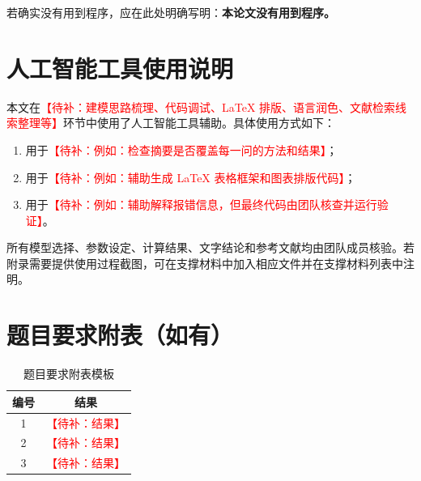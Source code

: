 \documentclass[UTF8,a4paper,zihao=5]{ctexart}
\numberwithin{equation}{section}
\numberwithin{figure}{section}
\numberwithin{table}{section}
\newcommand{\todo}[1]{\textcolor{red}{【待补：#1】}}
\begin{document}
若确实没有用到程序，应在此处明确写明：\textbf{本论文没有用到程序。}

\section{人工智能工具使用说明}
本文在\todo{建模思路梳理、代码调试、LaTeX 排版、语言润色、文献检索线索整理等}环节中使用了人工智能工具辅助。具体使用方式如下：
\begin{enumerate}
  \item 用于\todo{例如：检查摘要是否覆盖每一问的方法和结果}；
  \item 用于\todo{例如：辅助生成 LaTeX 表格框架和图表排版代码}；
  \item 用于\todo{例如：辅助解释报错信息，但最终代码由团队核查并运行验证}。
\end{enumerate}
所有模型选择、参数设定、计算结果、文字结论和参考文献均由团队成员核验。若附录需要提供使用过程截图，可在支撑材料中加入相应文件并在支撑材料列表中注明。

\section{题目要求附表（如有）}
\begin{table}[H]
  \centering
  \caption{题目要求附表模板}
  \begin{tabular}{cc}
    \toprule
    编号 & 结果 \\
    \midrule
    1 & \todo{结果} \\
    2 & \todo{结果} \\
    3 & \todo{结果} \\
    \bottomrule
  \end{tabular}
\end{table}
\end{document}
